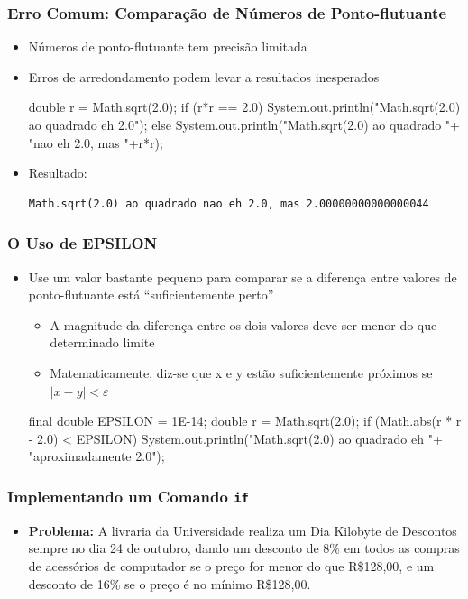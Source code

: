 \documentclass[xcolor={dvipsnames,table},aspectratio=169]{beamer}
\begin{document}
\begin{frame}[fragile]\frametitle{Erro Comum: Comparação de Números de Ponto-flutuante}
\begin{itemize}
	\item Números de ponto-flutuante tem precisão limitada
	\item Erros de arredondamento podem levar a resultados inesperados
{\small
\begin{javacode}
double r = Math.sqrt(2.0);
if (r*r == 2.0) {
   System.out.println("Math.sqrt(2.0) ao quadrado eh 2.0");
}
else {
   System.out.println("Math.sqrt(2.0) ao quadrado "+
                      "nao eh 2.0, mas "+r*r);   
}
\end{javacode}
}
	\item Resultado:
\begin{verbatim}
Math.sqrt(2.0) ao quadrado nao eh 2.0, mas 2.00000000000000044
\end{verbatim}
\end{itemize}
\end{frame}

\begin{frame}[fragile]\frametitle{O Uso de EPSILON}
\begin{itemize}
	\item Use um valor bastante pequeno para comparar se a diferença entre valores de ponto-flutuante está ``suficientemente perto''
	\begin{itemize}
		\item A magnitude da diferença entre os dois valores deve ser menor do que determinado limite
		\item Matematicamente, diz-se que x e y estão suficientemente próximos se $|x-y|<\varepsilon$
	\end{itemize}
\begin{javacode}
final double EPSILON = 1E-14;
double r = Math.sqrt(2.0);
if (Math.abs(r * r - 2.0) < EPSILON) {
   System.out.println("Math.sqrt(2.0) ao quadrado eh "+
                      "aproximadamente 2.0");
}
\end{javacode}
\end{itemize}
\end{frame}

\begin{frame}\frametitle{Implementando um Comando \texttt{if}}
\begin{itemize}
\item \textbf{Problema:} A livraria da Universidade realiza um Dia Kilobyte de Descontos sempre no dia 24 de outubro,
dando um desconto de 8\% em todos as compras de acessórios de computador se o preço for menor do que R\$128,00, e um
desconto de 16\% se o preço é no mínimo R\$128,00.
\end{itemize}
\end{frame}
\end{document}
